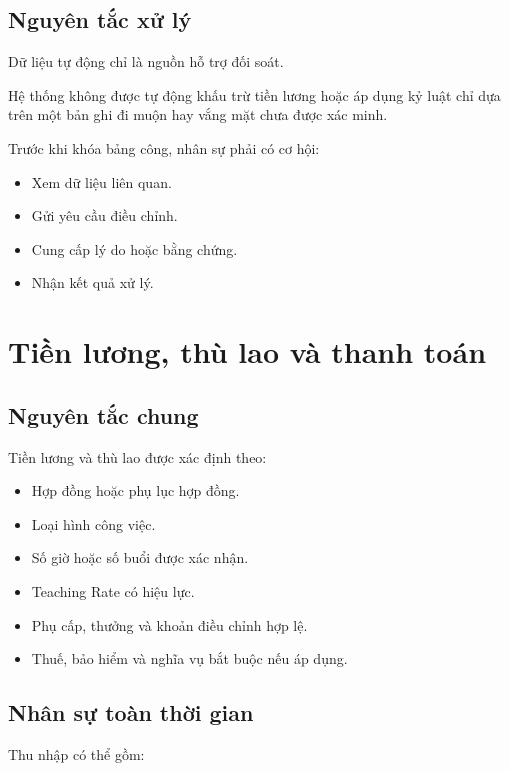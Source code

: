 \documentclass[12pt,a4paper]{article}
\begin{document}
\subsection{Nguyên tắc xử lý}

Dữ liệu tự động chỉ là nguồn hỗ trợ đối soát.

Hệ thống không được tự động khấu trừ tiền lương hoặc áp dụng kỷ luật
chỉ dựa trên một bản ghi đi muộn hay vắng mặt chưa được xác minh.

Trước khi khóa bảng công, nhân sự phải có cơ hội:

\begin{itemize}
    \item Xem dữ liệu liên quan.
    \item Gửi yêu cầu điều chỉnh.
    \item Cung cấp lý do hoặc bằng chứng.
    \item Nhận kết quả xử lý.
\end{itemize}

\section{Tiền lương, thù lao và thanh toán}

\subsection{Nguyên tắc chung}

Tiền lương và thù lao được xác định theo:

\begin{itemize}
    \item Hợp đồng hoặc phụ lục hợp đồng.
    \item Loại hình công việc.
    \item Số giờ hoặc số buổi được xác nhận.
    \item Teaching Rate có hiệu lực.
    \item Phụ cấp, thưởng và khoản điều chỉnh hợp lệ.
    \item Thuế, bảo hiểm và nghĩa vụ bắt buộc nếu áp dụng.
\end{itemize}

\subsection{Nhân sự toàn thời gian}

Thu nhập có thể gồm:
\end{document}
